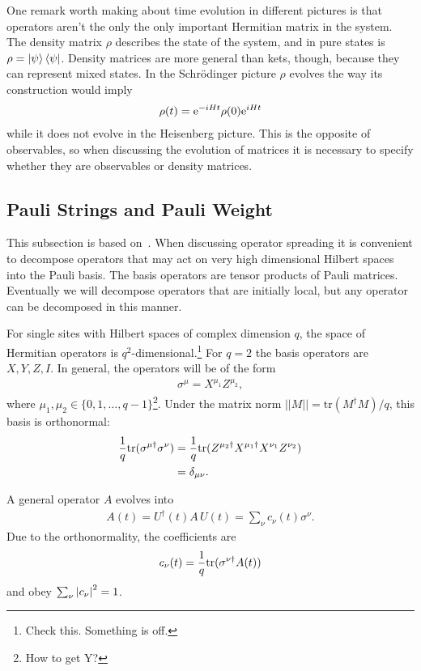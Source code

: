 One remark worth making about time evolution in different pictures is that operators aren't the only the only important Hermitian matrix in the system. The density matrix $\rho$ describes the state of the system, and in pure states is $\rho = \left|\psi\right\rangle\left\langle\psi\right|$. Density matrices are more general than kets, though, because they can represent mixed states. In the Schr\"odinger picture $\rho$ evolves the way its construction would imply
\begin{align}
\rho(t) = \text{e}^{-iHt}\rho(0)\text{e}^{iHt}
\end{align}
while it does not evolve in the Heisenberg picture. This is the opposite of observables, so when discussing the evolution of matrices it is necessary to specify whether they are observables or density matrices.

\subsection{Pauli Strings and Pauli Weight} \label{sub:pauli}

This subsection is based on~\cite{Keyserlingk}. When discussing operator spreading it is convenient to decompose operators that may act on very high dimensional Hilbert spaces into the Pauli basis. The basis operators are tensor products of Pauli matrices. Eventually we will decompose operators that are initially local, but any operator can be decomposed in this manner.

For single sites with Hilbert spaces of complex dimension $q$, the space of Hermitian operators is $q^2$-dimensional.\footnote{Check this. Something is off.} For $q=2$ the basis operators are $X, Y, Z, I$. In general, the operators will be of the form 
\begin{align}
\sigma^\mu = X^{\mu_1}Z^{\mu_2},
\end{align}
where $\mu_1, \mu_2\in\{0,1,\dots,q-1\}$\footnote{How to get Y?}. Under the matrix norm $||M|| = \text{tr}(M^\dag M)/q$, this basis is orthonormal:
\begin{align}
\frac{1}{q}\text{tr}(\sigma^{\mu\dag}\sigma^\nu) &= \frac{1}{q}\text{tr}(Z^{\mu_2\dag}
	X^{\mu_1\dag}X^{\nu_1}Z^{\nu_2})\nonumber\\
&= \delta_{\mu\nu}.\label{eqn:orthonorm}
\end{align}

A general operator $A$ evolves into
\begin{align}
A(t) = U^\dag(t)A\,U(t) = \sum_\nu c_\nu(t)\sigma^\nu.\label{eqn:decomp}
\end{align}
Due to the orthonormality, the coefficients are 
\begin{align}
c_\nu(t) = \frac{1}{q}\text{tr}(\sigma^{\nu\dag}A(t))
\end{align}
and obey $\sum_\nu \left|c_\nu\right|^2 = 1$.

